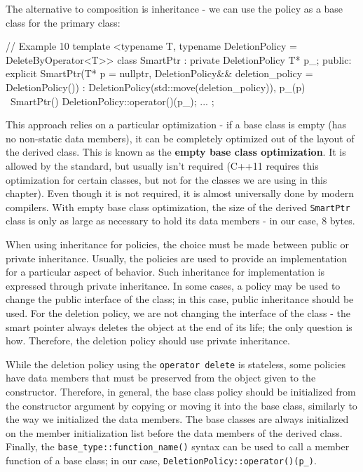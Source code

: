 The alternative to composition is inheritance - we can use the policy as a base class for the primary class:

\begin{code}
// Example 10
template <typename T,
          typename DeletionPolicy = DeleteByOperator<T>>
class SmartPtr : private DeletionPolicy {
  T* p_;
  public:
  explicit SmartPtr(T* p = nullptr,
    DeletionPolicy&& deletion_policy = DeletionPolicy())
  : DeletionPolicy(std::move(deletion_policy)), p_(p)
  {}
  ~SmartPtr() {
    DeletionPolicy::operator()(p_);
  }
  ...
};
\end{code}

This approach relies on a particular optimization - if a base class is empty (has no non-static data members), it can be completely optimized out of the layout of the derived class. This is known as the \textbf{empty base class optimization}. It is allowed by the standard, but usually isn't required (C++11 requires this optimization for certain classes, but not for the classes we are using in this chapter). Even though it is not required, it is almost universally done by modern compilers. With empty base class optimization, the size of the derived \texttt{SmartPtr} class is only as large as necessary to hold its data members - in our case, 8 bytes.

When using inheritance for policies, the choice must be made between public or private inheritance. Usually, the policies are used to provide an implementation for a particular aspect of behavior. Such inheritance for implementation is expressed through private inheritance. In some cases, a policy may be used to change the public interface of the class; in this case, public inheritance should be used. For the deletion policy, we are not changing the interface of the class - the smart pointer always deletes the object at the end of its life; the only question is how. Therefore, the deletion policy should use private inheritance.

While the deletion policy using the \texttt{operator\ delete} is stateless, some policies have data members that must be preserved from the object given to the constructor. Therefore, in general, the base class policy should be initialized from the constructor argument by copying or moving it into the base class, similarly to the way we initialized the data members. The base classes are always initialized on the member initialization list before the data members of the derived class. Finally, the \texttt{base\_type::function\_name()} syntax can be used to call a member function of a base class; in our case, \texttt{DeletionPolicy::operator()(p\_)}.

